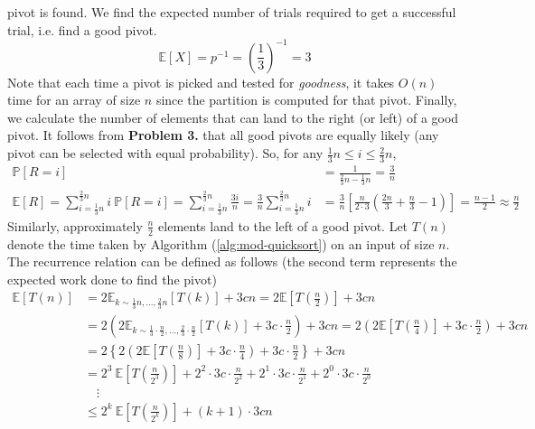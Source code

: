 \documentclass[9pt]{article}
\begin{document}
pivot is found. We find the expected number of trials required to get a successful trial, i.e. find a good pivot.
\begin{equation}
    \label{exp-X}
    \mathbb{E}[X] = p^{-1} = \left(\frac{1}{3} \right)^{-1} = 3
\end{equation}
Note that each time a pivot is picked and tested for \textit{goodness}, it takes $O(n)$ time for an array of size $n$
since the partition is computed for that pivot. Finally, we calculate the number of elements that can land to
the right (or left) of a good pivot. It follows from \textbf{Problem 3.} that all good pivots are equally likely (any pivot can be selected with equal probability).
So, for any $\frac{1}{3} n \leq i \leq \frac{2}{3} n$,
\begin{align}
    \label{R2}
    \mathbb{P}[R = i] &= \frac{1}{\frac{2}{3}n - \frac{1}{3}n} = \frac{3}{n} \\
    \label{exp-R2}
    \mathbb{E}[R] = \sum_{i=\frac{1}{3}n}^{\frac{2}{3}n} i \ \mathbb{P}[R = i] = \sum_{i=\frac{1}{3}n}^{\frac{2}{3}n} \frac{3i}{n}
    = \frac{3}{n} \sum_{i=\frac{1}{3}n}^{\frac{2}{3}n} i &= \frac{3}{n} \left[ \frac{n}{2 \cdot 3} \left( \frac{2n}{3} + \frac{n}{3} - 1 \right) \right]
    = \frac{n-1}{2} \approx \frac{n}{2}
\end{align}
Similarly, approximately $\frac{n}{2}$ elements land to the left of a good pivot. Let
$T(n)$ denote the time taken by Algorithm (\ref{alg:mod-quicksort}) on an input of size $n$.
The recurrence relation can be defined as follows (the second term represents the expected work done
to find the pivot)
\begin{equation}
    \label{exp-Tn-mod-quicksort}
    \begin{split}
        \mathbb{E}[T(n)] &= 2 \mathbb{E}_{k \sim \frac{1}{3}n, \dots, \frac{2}{3}n}[T(k)] + 3cn
        = 2 \mathbb{E}\left[T\left( \frac{n}{2} \right)\right] + 3cn \\
        &= 2 \left( 2 \mathbb{E}_{k \sim \frac{1}{3}\cdot\frac{n}{2}, \dots, \frac{2}{3}\cdot\frac{n}{2}}[T(k)] + 3c \cdot \frac{n}{2} \right) + 3cn
        = 2 \left( 2 \mathbb{E}\left[T\left( \frac{n}{4} \right)\right] + 3c \cdot \frac{n}{2} \right) + 3cn \\
        &= 2 \left\{ 2 \left( 2 \mathbb{E}\left[T\left( \frac{n}{8} \right)\right] + 3c \cdot \frac{n}{4} \right) + 3c \cdot \frac{n}{2} \right\} + 3cn \\
        &= 2^{3} \ \mathbb{E}\left[T\left( \frac{n}{2^{3}} \right)\right] + 2^{2} \cdot 3c \cdot \frac{n}{2^{2}} + 2^{1} \cdot 3c \cdot \frac{n}{2^{1}} + 2^{0} \cdot 3c \cdot \frac{n}{2^{0}} \\
        &\quad \vdots \\
        &\leq 2^{k} \ \mathbb{E}\left[ T\left( \frac{n}{2^{k}} \right) \right] + (k+1) \cdot 3cn
    \end{split}
\end{equation}
\end{document}
